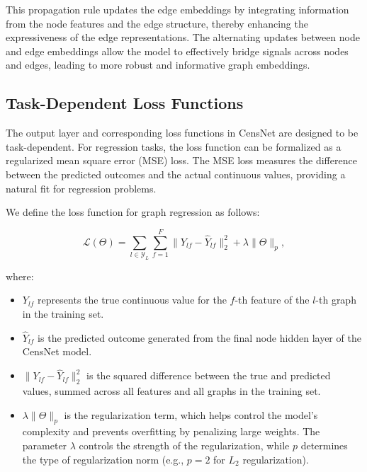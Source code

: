 This propagation rule updates the edge embeddings by integrating information from the node features and the edge structure, thereby enhancing the expressiveness of the edge representations. The alternating updates between node and edge embeddings allow the model to effectively bridge signals across nodes and edges, leading to more robust and informative graph embeddings.




\subsection{Task-Dependent Loss Functions}

The output layer and corresponding loss functions in CensNet are designed to be task-dependent. For regression tasks, the loss function can be formalized as a regularized mean square error (MSE) loss. The MSE loss measures the difference between the predicted outcomes and the actual continuous values, providing a natural fit for regression problems.


We define the loss function for graph regression as follows:

\begin{equation}
\mathcal{L}(\Theta) = \sum_{l \in \mathcal{Y}_L} \sum_{f=1}^{F} \| Y_{lf} - \hat{Y}_{lf} \|^2_2 + \lambda \|\Theta\|_p,
\end{equation}

where:

\begin{itemize}
    \item \( Y_{lf} \) represents the true continuous value for the \( f \)-th feature of the \( l \)-th graph in the training set.
    \item \( \hat{Y}_{lf} \) is the predicted outcome generated from the final node hidden layer of the CensNet model.
    \item \( \| Y_{lf} - \hat{Y}_{lf} \|^2_2 \) is the squared difference between the true and predicted values, summed across all features and all graphs in the training set.
    \item \( \lambda \|\Theta\|_p \) is the regularization term, which helps control the model's complexity and prevents overfitting by penalizing large weights. The parameter \( \lambda \) controls the strength of the regularization, while \( p \) determines the type of regularization norm (e.g., \( p=2 \) for \( L_2 \) regularization).
\end{itemize}



